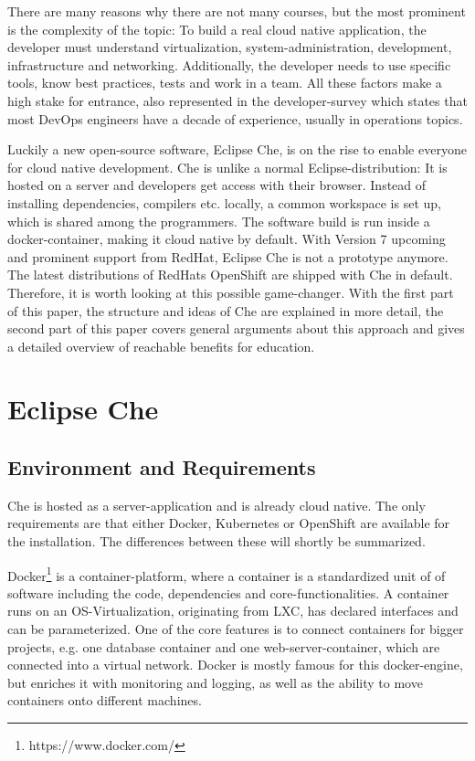 \documentclass[english,utf8]{lni}
\begin{document}
There are many reasons why there are not many courses, but the most prominent is the complexity of the topic: 
To build a real cloud native application, the developer must understand virtualization, system-administration, development, 
infrastructure  and  networking. 
Additionally, the developer needs to use specific tools, know best practices, tests and work in a team.
All these factors make a high stake for entrance, also  represented in the developer-survey \cite{SO19} which states that most DevOps engineers have a decade of experience, usually in operations topics.

Luckily a new open-source software, Eclipse Che, is on the rise to enable everyone for cloud native development.
Che is unlike a normal Eclipse-distribution: 
It is hosted on a server and developers get access with their browser. 
Instead of installing dependencies, compilers etc. locally, a common workspace is set up, which is shared among the programmers. 
The software build is run inside a docker-container, making it cloud native by default. 
With Version 7 upcoming and prominent support from RedHat, Eclipse Che is not a prototype anymore. 
The latest distributions of RedHats OpenShift are shipped with Che in default. 
Therefore, it is worth looking at this possible game-changer. 
With the first part of this paper, the structure and ideas of Che are explained in more detail, the second part of this paper covers general arguments about this approach and gives a detailed overview of reachable benefits for education.    

\section{Eclipse Che}
\label{sec:Che}
\subsection{Environment and Requirements}
\label{subsec:Req}
Che is hosted as a server-application and is already cloud native. 
The only requirements are that either Docker, Kubernetes or OpenShift are available for the installation.
The differences between these will shortly be summarized.
 
Docker\footnote{https://www.docker.com/} is a container-platform, where a container is a standardized unit of of software including the code, dependencies and core-functionalities. 
A container runs on an OS-Virtualization, originating from LXC, has declared interfaces and can be parameterized. 
One of the core features is to connect containers for bigger projects, e.g. one 
database container and one web-server-container, which are connected into a virtual network. 
Docker is mostly famous for this docker-engine, but enriches it with monitoring and logging, as well as the ability to move containers onto different machines.   
\end{document}
